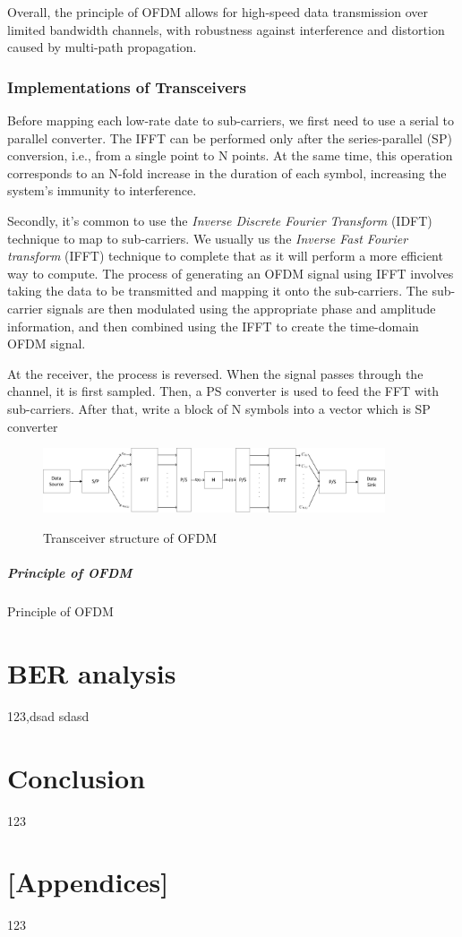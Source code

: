 \documentclass{article}
\begin{document}
Overall, the principle of OFDM allows for high-speed data transmission over limited bandwidth channels, with robustness against interference and distortion caused by multi-path propagation.

\subsubsection{Implementations of Transceivers}
Before mapping each low-rate date to sub-carriers, we first need to use a serial to parallel converter. The IFFT can be performed only after the series-parallel (SP) conversion, i.e., from a single point to N points. At the same time, this operation corresponds to an N-fold increase in the duration of each symbol, increasing the system's immunity to interference.

Secondly, it's common to use the \textit{Inverse Discrete Fourier Transform} (IDFT) technique to map to sub-carriers. We usually us the \textit{Inverse Fast Fourier transform} (IFFT) technique to complete that as it will perform a more efficient way to compute. The process of generating an OFDM signal using IFFT involves taking the data to be transmitted and mapping it onto the sub-carriers. The sub-carrier signals are then modulated using the appropriate phase and amplitude information, and then combined using the IFFT to create the time-domain OFDM signal. 

At the receiver, the process is reversed. When the signal passes through the channel, it is first sampled. Then, a PS converter is used to feed the FFT with sub-carriers. After that, write a block of N symbols into a vector which is SP converter

\begin{figure}[!h]
  \centering
  \includegraphics[width=0.9\textwidth]{images/OFDM_transceiver.pdf}\\
  \caption{Transceiver structure of OFDM}
  \label{fig:env}
\end{figure}

\subparagraph{Principle of OFDM}
Principle of OFDM


\section{BER analysis}
123\cite{RN79},dsad
sdasd

\section{Conclusion}
123





\section{[Appendices]}
123


	
\end{document}
